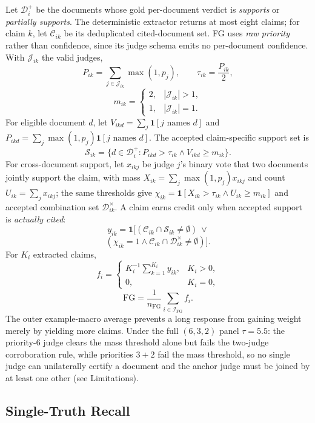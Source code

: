 Let $\mathcal{D}_i^{+}$ be the documents whose gold per-document verdict is
\textit{supports} or \textit{partially supports}. The deterministic extractor
returns at most eight claims; for claim $k$, let $\mathcal{C}_{ik}$ be its
deduplicated cited-document set. FG uses \emph{raw priority} rather than
confidence, since its judge schema emits no per-document confidence. With
$\mathcal{J}_{ik}$ the valid judges,
\[
P_{ik}=\!\!\sum_{j\in\mathcal{J}_{ik}}\!\!\max(1,p_j),\qquad
\tau_{ik}=\frac{P_{ik}}{2},
\]
\[
m_{ik}=\begin{cases}2,&|\mathcal{J}_{ik}|>1,\\ 1,&|\mathcal{J}_{ik}|=1.\end{cases}
\]
For eligible document $d$, let $V_{ikd}=\sum_j\mathbf{1}[j\text{ names }d]$ and
$P_{ikd}=\sum_j\max(1,p_j)\mathbf{1}[j\text{ names }d]$. The accepted
claim-specific support set is
\[
\mathcal{S}_{ik}=\{d\in\mathcal{D}_i^{+} : P_{ikd}>\tau_{ik} \wedge V_{ikd}\geq m_{ik}\}.
\]
For cross-document support, let $x_{ikj}$ be judge $j$'s binary vote that two
documents jointly support the claim, with mass $X_{ik}=\sum_j\max(1,p_j)x_{ikj}$
and count $U_{ik}=\sum_j x_{ikj}$; the same thresholds give
$\chi_{ik}=\mathbf{1}[X_{ik}>\tau_{ik}\wedge U_{ik}\geq m_{ik}]$ and accepted
combination set $\mathcal{D}^{\times}_{ik}$. A claim earns credit only when
accepted support is \emph{actually cited}:
\[
y_{ik}=\mathbf{1}\big[(\mathcal{C}_{ik}\cap\mathcal{S}_{ik}\neq\emptyset)
\ \vee
\]
\[
(\chi_{ik}=1 \wedge \mathcal{C}_{ik}\cap\mathcal{D}^{\times}_{ik}\neq\emptyset)\big].
\]
For $K_i$ extracted claims,
\[
f_i=\begin{cases}K_i^{-1}\sum_{k=1}^{K_i}y_{ik},&K_i>0,\\ 0,&K_i=0,\end{cases}
\]
\[
\mathrm{FG}=\frac{1}{n_{\mathrm{FG}}}\sum_{i\in\mathcal{I}_{\mathrm{FG}}}f_i.
\]
The outer example-macro average prevents a long response from gaining weight
merely by yielding more claims. Under the full $(6,3,2)$ panel $\tau=5.5$: the
priority-6 judge clears the mass threshold alone but fails the two-judge
corroboration rule, while priorities $3+2$ fail the mass threshold, so no single
judge can unilaterally certify a document and the anchor judge must be joined by
at least one other (see Limitations).

\subsection{Single-Truth Recall}

